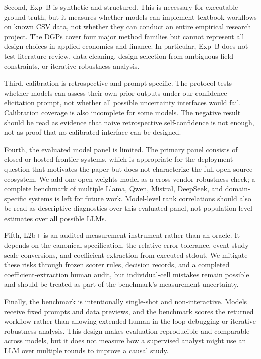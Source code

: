 \documentclass{article}
\begin{document}
Second, Exp~B is synthetic and structured. This is necessary for
executable ground truth, but it measures whether models can implement
textbook workflows on known CSV data, not whether they can conduct an
entire empirical research project. The DGPs cover four major method
families but cannot represent all design choices in applied economics
and finance. In particular, Exp~B does not test literature review, data
cleaning, design selection from ambiguous field constraints, or
iterative robustness analysis.

Third, calibration is retrospective and prompt-specific. The protocol
tests whether models can assess their own prior outputs under our
confidence-elicitation prompt, not whether all possible uncertainty
interfaces would fail. Calibration coverage is also incomplete for some
models. The negative result should be read as evidence that naive
retrospective self-confidence is not enough, not as proof that no
calibrated interface can be designed.

Fourth, the evaluated model panel is limited. The primary panel consists
of closed or hosted frontier systems, which is appropriate for the
deployment question that motivates the paper but does not characterize
the full open-source ecosystem. We add one open-weights model as a
cross-vendor robustness check; a complete benchmark of multiple Llama,
Qwen, Mistral, DeepSeek, and domain-specific systems is left for future
work. Model-level rank correlations should also be read as descriptive
diagnostics over this evaluated panel, not population-level estimates
over all possible LLMs.

Fifth, L2b+ is an audited measurement instrument rather than an oracle.
It depends on the canonical specification, the relative-error tolerance,
event-study scale conversions, and coefficient extraction from executed
stdout. We mitigate these risks through frozen scorer rules, decision
records, and a completed coefficient-extraction human audit, but
individual-cell mistakes remain possible and should be treated as part
of the benchmark's measurement uncertainty.

Finally, the benchmark is intentionally single-shot and non-interactive.
Models receive fixed prompts and data previews, and the benchmark scores
the returned workflow rather than allowing extended human-in-the-loop
debugging or iterative robustness analysis. This design makes evaluation
reproducible and comparable across models, but it does not measure how a
supervised analyst might use an LLM over multiple rounds to improve a
causal study.
\end{document}
